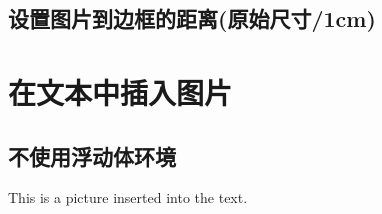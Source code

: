 \documentclass{article}
\begin{document}
\subsection{设置图片到边框的距离(原始尺寸/1cm)}
    {\setlength{\fboxsep}{1cm}
    }

\section{在文本中插入图片}
\subsection{不使用浮动体环境}
    This is a picture  inserted into the text.
\end{document}
